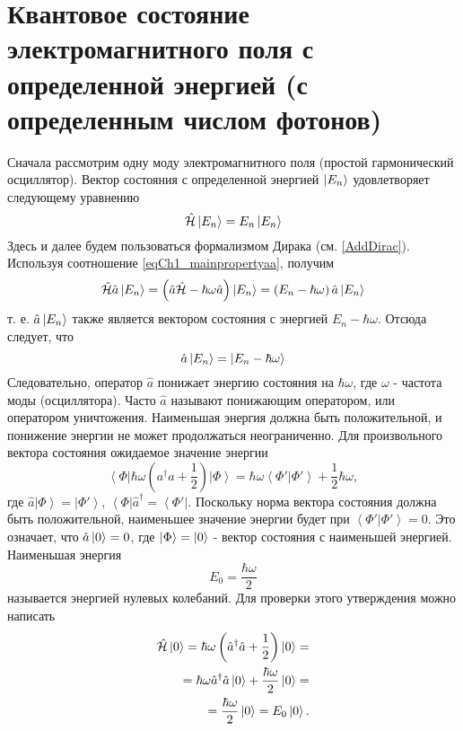 \section{Квантовое состояние электромагнитного поля с определенной
  энергией (с определенным числом фотонов)}
Сначала рассмотрим одну моду электромагнитного поля (простой
гармонический осциллятор). Вектор состояния с определенной энергией
$\ket{E_n}$ удовлетворяет следующему уравнению
\begin{equation}
\hat{\mathcal{H}} \ket{E_n} = E_n \ket{E_n}
\end{equation}
Здесь и далее будем пользоваться формализмом Дирака (см. 
\autoref{AddDirac}). Используя соотношение \eqref{eqCh1_mainpropertyaa},
получим 
\begin{equation}
\hat{\mathcal{H}} \hat{a}\ket{E_n} = 
\left(\hat{a}\hat{\mathcal{H}} -
\hbar\omega\hat{a}\right)\ket{E_n} =
\left(E_n - \hbar \omega\right)\hat{a}\ket{E_n}
\end{equation}
т. е. $\hat{a}\ket{E_n}$ также является вектором состояния с
энергией $E_n - \hbar \omega$.  Отсюда следует, что
\[
\hat{a}\ket{E_n} = \left|E_n - \hbar \omega \right>
\] 
Следовательно, оператор $\hat{a}$ понижает энергию состояния на $\hbar
\omega$,  где $\omega$ - частота моды (осциллятора). Часто $\hat{a}$
называют понижающим оператором, или оператором уничтожения. Наименьшая
энергия должна быть положительной, и понижение энергии не может
продолжаться неограниченно. Для произвольного вектора состояния
ожидаемое значение энергии 
\begin{equation}
\left< \Phi \right| \hbar \omega \left({a}^{\dag} {a}  +
\frac{1}{2}\right)\left| \Phi \right> = 
\hbar \omega \left< \Phi' \right. \left| \Phi' \right> + \frac{1}{2}
\hbar \omega,
\end{equation}
где  $\hat{a} \left| \Phi \right> = \left| \Phi' \right>$,  
$\left< \Phi \right| \hat{a}^{\dag}  = \left< \Phi' \right|$.  Поскольку
норма вектора состояния должна быть положительной, 
наименьшее значение энергии будет при  
\(
\left< \Phi' \right. \left| \Phi' \right> = 0.
\)
Это означает, что $\hat{a}\ket{0} = 0$,  где
$\left|\Phi\right> = \ket{0}$ -  вектор состояния с наименьшей
энергией. Наименьшая энергия  
\begin{equation}
E_0 = \frac{\hbar \omega}{2}
\end{equation}
называется энергией нулевых колебаний. Для проверки этого утверждения
можно написать
\begin{eqnarray}
\hat{\mathcal{H}} \ket{0} = 
\hbar \omega \left(\hat{a}^{\dag} \hat{a} +
\frac{1}{2}\right) \ket{0} = 
\nonumber \\
= 
\hbar \omega \hat{a}^{\dag} \hat{a} \ket{0} +
\frac{\hbar \omega}{2}\ket{0} =
\nonumber \\
= \frac{\hbar \omega}{2} \ket{0} = 
E_0 \ket{0}.
\label{eqProper0state}
\end{eqnarray}


